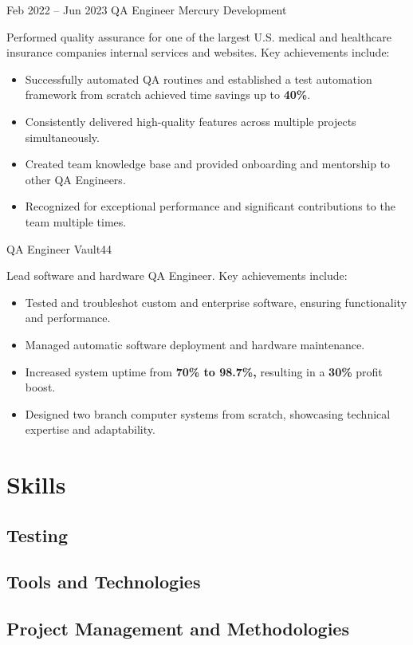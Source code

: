 \documentclass[11pt,a4paper,sans]{moderncv}
\begin{document}
\cventry
{Feb 2022 -- Jun 2023}
{QA Engineer}
{Mercury Development}
{}{}
{Performed quality assurance for one of the largest U.S. medical and healthcare insurance companies internal services and websites. Key achievements include:
\begin{itemize}
\item Successfully automated QA routines and established a test automation framework from scratch achieved time savings up to \textbf{40\%}.
\item Consistently delivered high-quality features across multiple projects simultaneously.
\item Created team knowledge base and provided onboarding and mentorship to other QA Engineers.
\item Recognized for exceptional performance and significant contributions to the team multiple times.
\end{itemize}}

{QA Engineer}
{Vault44}
{}{}
{Lead software and hardware QA Engineer. Key achievements include:
\begin{itemize}
\item Tested and troubleshot custom and enterprise software, ensuring functionality and performance.
\item Managed automatic software deployment and hardware maintenance.
\item Increased system uptime from \textbf{70\% to 98.7\%,} resulting in a \textbf{30\%} profit boost.
\item Designed two branch computer systems from scratch, showcasing technical expertise and adaptability.
\end{itemize}}

\section{Skills}

\subsection{Testing}

\subsection{Tools and Technologies}

\subsection{Project Management and Methodologies}
\end{document}

